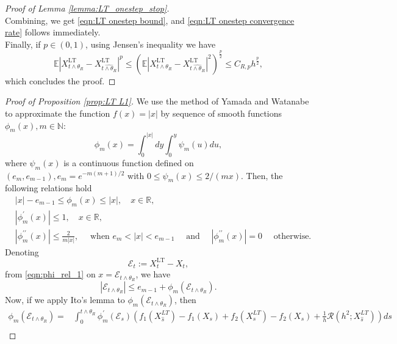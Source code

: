 \documentclass[a4paper,12pt]{article}
\numberwithin{equation}{section}
\theoremstyle{plain}
\theoremstyle{definition}
\begin{document}
\begin{appendix}
\begin{proof}[Proof of Lemma \ref{lemma:LT_onestep_stop}]
\begin{equation*}
    \end{equation*}
    Combining, we get \eqref{eqn:LT onestep bound}, and \eqref{eqn:LT onestep convergence rate} follows immediately.\\
    Finally, if $p\in (0,1)$, using Jensen's inequality we have
    \begin{equation}
        \mathbb{E}\left|X^{\textrm{LT}}_{t\wedge \theta_R}-X^{\textrm{LT}}_{\widehat{t\wedge \theta_R}}\right|^p\leq  \left(\mathbb{E}\left|X^{\textrm{LT}}_{t\wedge \theta_R}-X^{\textrm{LT}}_{\widehat{t\wedge \theta_R}}\right|^2\right)^{\frac{p}{2}}\leq C_{R,p}h^{\frac{p}{2}},
    \end{equation}
    which concludes the proof.
\end{proof}

\begin{proof}[Proof of Proposition \ref{prop:LT L1}]
    We use the method of Yamada and Watanabe \cite{yamada_uniqueness_1971} to approximate the function $f(x)=|x|$ by sequence of smooth functions $\phi_m(x), m\in \mathbb{N}$:
    \begin{equation*}
        \phi_m(x)=\int_0^{|x|} d y \int_0^y \psi_m(u) d u,
    \end{equation*}
    where $\psi_m(x)$ is a continuous function defined on $(e_m,e_{m-1}), e_m=e^{-m(m+1)/2}$ with $0 \leq \psi_m(x) \leq 2 /(m x)$. Then, the  following relations hold
    \begin{align}
        &|x|-e_{m-1} \leq \phi_m(x) \leq|x|, \quad x \in \mathbb{R},\label{eqn:phi_rel_1} \\
        &\left|\phi_m^{\prime}(x)\right| \leq 1, \quad x \in \mathbb{R},\label{eqphi2}\\
        &\left|\phi_m^{\prime \prime}(x)\right| \leq \frac{2}{m|x|}, \quad \text { when } e_m<|x|<e_{m-1} \quad \text { and } \quad\left|\phi_m^{\prime \prime}(x)\right|=0 \quad \text { otherwise. }\label{eqn:phi_rel_2}
    \end{align}
    Denoting
    \[
    \mathcal{E}_t:=X^{\textrm{LT}}_t
    -X_t,
    \]
    from \eqref{eqn:phi_rel_1} on $x=\mathcal{E}_{t\wedge\theta_R}$, we have
    \begin{equation}
\left|\mathcal{E}_{t \wedge \theta_R}\right| \leq e_{m-1}+\phi_m\left(\mathcal{E}_{t \wedge \theta_R}\right) .
\end{equation}
Now, if we apply Ito's lemma to $\phi_m\left(\mathcal{E}_{t \wedge \theta_R}\right)$,  then
\begin{align*}
    \phi_m(\mathcal{E}_{t\wedge \theta_R})=&\int_0^{t\wedge \theta_R}\phi^{\prime}_m(\mathcal{E}_s)\left(f_1(X^{LT}_{\hat{s}})-f_1(X_s)+f_2(X^{LT}_s)-f_2(X_s)+\frac{1}{h}\mathcal{R}(h^2;X^{LT}_{\hat{s}})\right)ds\\

\end{align*}
\end{proof}
\end{appendix}
\end{document}

